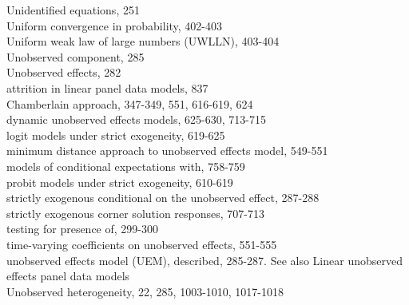 \documentclass[10pt]{article}
\begin{document}
Unidentified equations, 251\\
Uniform convergence in probability, 402-403\\
Uniform weak law of large numbers (UWLLN), 403-404\\
Unobserved component, 285\\
Unobserved effects, 282\\
attrition in linear panel data models, 837\\
Chamberlain approach, 347-349, 551, 616-619, 624\\
dynamic unobserved effects models, 625-630, 713-715\\
logit models under strict exogeneity, 619-625\\
minimum distance approach to unobserved effects model, 549-551\\
models of conditional expectations with, 758-759\\
probit models under strict exogeneity, 610-619\\
strictly exogenous conditional on the unobserved effect, 287-288\\
strictly exogenous corner solution responses, 707-713\\
testing for presence of, 299-300\\
time-varying coefficients on unobserved effects, 551-555\\
unobserved effects model (UEM), described, 285-287. See also Linear unobserved effects panel data models\\
Unobserved heterogeneity, 22, 285, 1003-1010, 1017-1018
\end{document}
